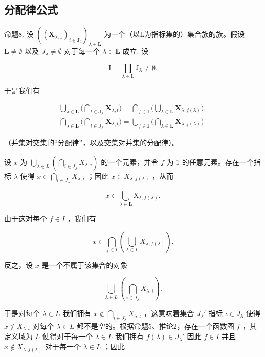 \subsection{分配律公式}

命题8. 设 \(((\mathbf{X}_{\lambda,1})_{i\in \mathbf{J}_2})_{\lambda \in \mathbf{L}}\) 为一个（以L为指标集的）集合族的族。假设 \(\mathbf{L}\neq \emptyset\) 以及 \(J_{\lambda}\neq \emptyset\) 对于每一个 \(\lambda \in \mathbf{L}\) 成立. 设

\[
\mathrm{I} = \prod_ {\lambda \in \mathrm{L}} \mathrm{J} _ {\lambda} \neq \emptyset .
\]

于是我们有

\[
\begin{array}{l} \bigcup_ {\lambda \in \mathbf {L}} \Big (\bigcap_ {t \in \mathbf {J} _ {\lambda}} \mathbf {X} _ {\lambda , t} \Big) = \bigcap_ {f \in \mathbf {I}} \Big (\bigcup_ {\lambda \in \mathbf {L}} \mathbf {X} _ {\lambda , f (\lambda)} \Big), \\ \bigcap_ {\lambda \in \mathbf {L}} \Big (\bigcap_ {t \in \mathbf {J} _ {\lambda}} \mathbf {X} _ {\lambda , t} \Big) = \bigcup_ {f \in \mathbf {I}} \Big (\bigcap_ {\lambda \in \mathbf {L}} \mathbf {X} _ {\lambda , f (\lambda)} \Big) \end{array}
\]

（并集对交集的“分配律”，以及交集对并集的分配律）。

设 \(x\) 为 \(\bigcup_{\lambda \in L} \left( \bigcap_{i \in J_{\lambda}} X_{\lambda, i} \right)\) 的一个元素，并令 \(f\) 为 1 的任意元素。存在一个指标 \(\lambda\) 使得 \(x \in \bigcap_{i \in J_{\lambda}} X_{\lambda, i}\) ；因此 \(x \in X_{\lambda, f(\lambda)}\) ，从而

\[
x \in \bigcup_ {\lambda \in \mathbf {L}} \mathrm{X} _ {\lambda , f (\lambda)}.
\]

由于这对每个 \(f \in I\) ，我们有

\[
x \in \bigcap_ {f \in I} \left(\bigcup_ {\lambda \in L} X _ {\lambda , f (\lambda)}\right).
\]

反之，设 \(x\) 是一个不属于该集合的对象

\[
\bigcup_ {\lambda \in L} \left(\bigcap_ {i \in J _ {\lambda}} X _ {\lambda , i}\right).
\]

于是对每个 \(\lambda \in L\) 我们拥有 \(x \notin \bigcap_{\iota \in J_{\lambda}} X_{\lambda, \iota}\) ，这意味着集合 \(J_{\lambda}'\) 指标 \(\iota \in J_{\lambda}\) 使得 \(x \notin X_{\lambda, \iota}\) 对每个 \(\lambda \in L\) 都不是空的。根据命题5、推论2，存在一个函数图 \(f\) ，其定义域为 \(L\) 使得对于每一个 \(\lambda \in L\) 我们拥有 \(f(\lambda) \in J_{\lambda}'\) 因此 \(f \in I\) 并且 \(x \notin X_{\lambda, f(\lambda)}\) 对于每一个 \(\lambda \in L\) ；因此

